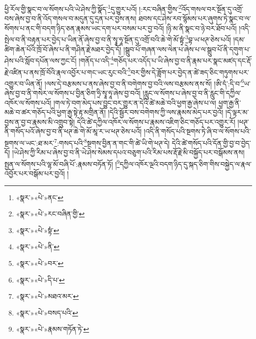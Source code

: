 ཕྱི་རོལ་གྱི་སྣང་བ་ལ་སོགས་པའི་ཡེ་ཤེས་ཀྱི་སྣོད་\footnote{«སྣར་»«པེ་»ནང་}དུ་གྱུར་པའོ། །:རང་བཞིན་གྱིས་\footnote{«སྣར་»«པེ་»རང་བཞིན་གྱི་}འོད་གསལ་བར་སྔོན་དུ་འགྲོ་བས་ཞེས་བྱ་བ་ནི་འོད་གསལ་བ་མདུན་དུ་དྲན་པར་བྱས་ནས། ཐབས་དང་ཤེས་རབ་སྙོམས་པར་ཞུགས་ཏེ་སྣང་བ་ལ་སོགས་པ་ནང་གི་བདག་ཉིད་ཅན་རྣམས་ཡང་དག་པར་བསམ་པར་བྱ་བའོ། །ཉི་མ་ནི་སྣང་བ་ཉེ་བར་ཐོབ་པའོ། །འདི་སྤེལ་བ་ནི་བརྟན་པར་བྱེད་པ་ཡིན་ནོ་ཞེས་བྱ་བ་ནི་སྭཱ་ཧཱ་སྔོན་དུ་འགྲོ་བའི་ཆེ་གེ་མོ་སྟྭཾ་\footnote{«སྣར་»«པེ་»སྟཾ་}བྷ་ཡ་ཕཊ་ཅེས་པའོ། །དམ་ཚིག་ཆེན་པོའི་ཁྲོ་བོ་ཞེས་པ་ནི་གཤིན་རྗེ་མཐར་བྱེད་དོ། །སྒྲུབ་པོ་གཞན་ལས་ལེན་པ་ཞེས་པ་ལ་སྒྲུབ་པོ་ནི་དགུག་པ་ཤེས་པའི་སློབ་དཔོན་ལས་ཀྱང་ངོ། །གནོད་པ་འདི་\footnote{«སྣར་»«པེ་»ནི་}གཅོད་པར་འདོད་པ་ཡི་ཞེས་བྱ་བ་ནི་རྣམ་པར་སྣང་མཛད་དང་རྡོ་རྗེ་འཛིན་པ་ནས་ཁྲོ་བོའི་རྣལ་འབྱོར་པ་གང་ཡང་རུང་བའི་\footnote{«སྣར་»«པེ་»བར་}བར་གྱིས་དེ་ཟློག་པར་བྱེད་ན་ཚེ་ཟད་ཅིང་གཏུགས་པར་འགྱུར་བ་ཡིན་ནོ། །ལས་དེ་བརྩམས་པ་ནས་ཞེས་བྱ་བ་ནི་བགེགས་བྱ་བའི་ལས་བརྩམས་ནས་སོ། །ཨི་དཾ་:དི་བ་\footnote{«སྣར་»«པེ་»དི་པ་}ཡ་ཞེས་བྱ་བ་ནི་གསེར་ལ་སོགས་པ་བྱིན་ཅིག་ཧྲི་སྭཱ་ཧཱ་ཞེས་བྱ་བའོ། །རླུང་ལ་སོགས་པ་ཞེས་བྱ་བ་ནི་རླུང་གི་དཀྱིལ་འཁོར་ལ་སོགས་པའོ། །གལ་ཏེ་བག་མེད་པས་བྱུང་བར་གྱུར་ན་དེའི་ཚེ་མཆེ་བའི་ཕྱག་རྒྱ་ཞེས་པ་ལ། ཕྱག་རྒྱ་ནི་མཆེ་བ་ཚར་གཅོད་པའི་ཕྱག་རྒྱ་སྟེ་རྟ་མགྲིན་ནོ། །དེའི་སྦྱོར་བས་བགེགས་ཀྱི་ལས་རྣམས་མེད་པར་བྱའོ། །དེ་ལྟར་མ་བྱས་ན་བྱ་བ་རྣམས་མི་འགྲུབ་སྟེ། དེའི་ཚེ་དཀྱིལ་འཁོར་ལ་སོགས་པ་རྣམས་འཇིག་ཅིང་གཅོད་པར་འགྱུར་རོ། །ཕཊ་ནི་གསོད་པའོ་ཞེས་བྱ་བ་ནི་ཕཊ་ཆེ་གེ་མོ་མཱ་ར་ཡ་ཕཊ་ཅེས་པའོ། །འདི་ནི་གསོད་པའི་སྔགས་ཏེ་ཞི་བ་ལ་སོགས་པའི་སྔགས་ལ་ཡང་:ཐ་མར་\footnote{«སྣར་»«པེ་»མཐའ་མར་}:གསད་པའི་\footnote{«སྣར་»«པེ་»བསད་པའི་}སྔགས་བྱིན་ན་གང་གི་ཚེ་ཡི་གེ་ཕཊ་དེ། དེའི་ཚེ་གསོད་པའི་དོན་གྱི་བྱ་བ་བྱེད་དོ། །ཡེ་ཤེས་ཀྱི་རིམ་པ་ཞེས་བྱ་བ་ནི་ཡེ་ཤེས་སེམས་དཔའ་བཅུག་པའི་རིམ་པས་རྡོ་རྗེ་མི་བསྐྱོད་པར་བསྒོམས་ནས། སྤྱན་ལ་སོགས་པའི་ལྷ་མོ་བཞི་པོ་:རྣམས་བཏོན་ཏོ། །\footnote{«སྣར་»«པེ་»རྣམས་གཏོན་ཏེ་}དཀྱིལ་འཁོར་ལྔའི་བདག་ཉིད་དུ་སྐད་ཅིག་གིས་བསྐྱེད་ལ་རྣལ་འབྱོར་པར་བསྒོམ་པར་བྱའོ། །
